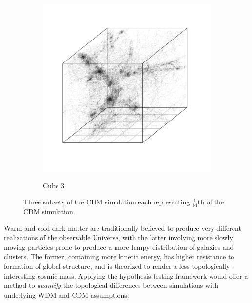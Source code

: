 \documentclass[12pt]{article}
\begin{document}
\begin{figure}[htp!]
\begin{subfigure}{0.31\textwidth}
    \label{fig:cubeDiagsB}
  \end{subfigure}
    \begin{subfigure}{0.31\textwidth}
    \centering
        \caption{Cube 3}
  \includegraphics[width=\linewidth]{figure_10_cdm_slice_51.pdf}
    \label{fig:cubeDiagsC}
  \end{subfigure}
    \caption{Three subsets of the CDM simulation each representing $\frac{1}{64}$th of the CDM simulation.}
    \label{fig:cubeDiags}
\end{figure}

Warm and cold dark matter are traditionally believed to produce very different realizations of the observable Universe, with the latter involving more slowly moving particles prone to produce a more lumpy distribution of galaxies and clusters. The former, containing more kinetic energy, has higher resistance to formation of global structure, and is theorized to render a less topologically-interesting cosmic mass. Applying the hypothesis testing framework would offer a method to \emph{quantify} the topological differences between simulations with underlying WDM and CDM assumptions.
\end{document}
